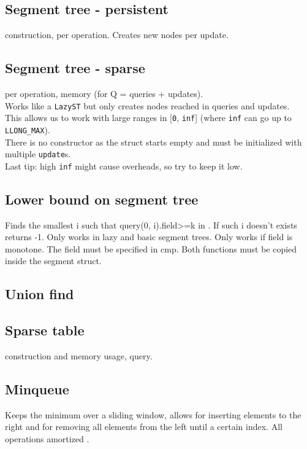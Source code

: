 \subsection{Segment tree - persistent}
 construction,  per operation.
Creates  new nodes per update.

\subsection{Segment tree - sparse}
 per operation,  memory (for Q = queries + updates).\\
Works like a \verb|LazyST| but only creates nodes reached in queries and updates.\\
This allows us to work with large ranges in [\verb|0|, \verb|inf|] (where \verb|inf| can go up to \verb|LLONG_MAX|).\\
There is no constructor as the struct starts empty and must be initialized with multiple \verb|update|s.\\
Last tip: high \verb|inf| might cause overheads, so try to keep it low.

\subsection{Lower bound on segment tree}
Finds the smallest i such that query(0, i).field>=k in .
If such i doesn't exists returns -1.
Only works in lazy and basic segment trees.
Only works if field is monotone. The field must be specified in cmp.
Both functions must be copied inside the segment struct.


\subsection{Union find}

\subsection{Sparse table}
 construction and memory usage,  query.

\subsection{Minqueue}
Keeps the minimum over a sliding window, allows for inserting elements to the right and for removing all elements from the left until a certain index. All operations amortized .

